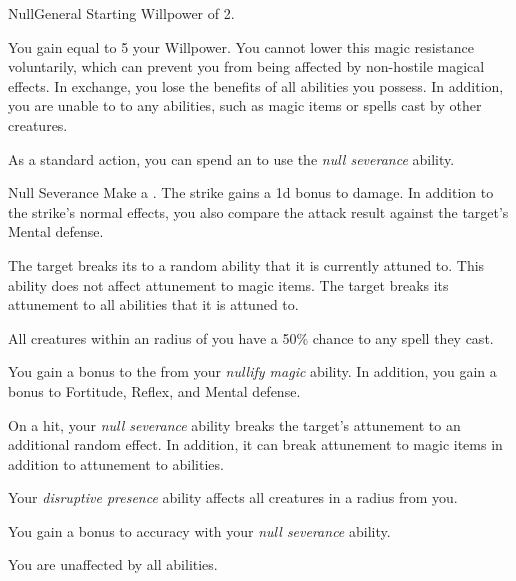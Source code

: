     \begin{feat}{Null}{General}
        \featpre Starting Willpower of 2.

         You gain  equal to 5 \add your Willpower.
        You cannot lower this magic resistance voluntarily, which can prevent you from being affected by non-hostile magical effects.
        In exchange, you lose the benefits of all  abilities you possess.
        In addition, you are unable to  to any  abilities, such as magic items or spells cast by other creatures.

         As a standard action, you can spend an  to use the \textit{null severance} ability.
        \begin{ability}{Null Severance}
            Make a .
            The strike gains a \plus1d bonus to damage.
            In addition to the strike's normal effects, you also compare the attack result against the target's Mental defense.

            \hit The target breaks its  to a random ability that it is currently attuned to.
            This ability does not affect attunement to magic items.
            \crit The target breaks its attunement to all abilities that it is attuned to.
        \end{ability}

         All creatures within an \areamed radius of you have a 50\% chance to  any spell they cast.

         You gain a  bonus to the  from your \textit{nullify magic} ability.
        In addition, you gain a  bonus to Fortitude, Reflex, and Mental defense.

         On a hit, your \textit{null severance} ability breaks the target's attunement to an additional random effect.
        In addition, it can break attunement to magic items in addition to attunement to abilities.

         Your \textit{disruptive presence} ability affects all creatures in a \arealarge radius  from you.

         You gain a  bonus to accuracy with your \textit{null severance} ability.

         You are unaffected by all  abilities.
    \end{feat}

